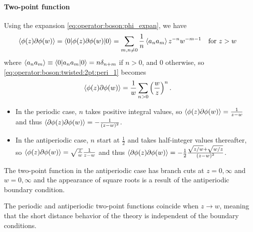 \documentclass[10pt]{article}
\begin{document}
\paragraph{Two-point function}
Using the expansion \cref{eq:operator:boson:phi_expan}, we have 
\begin{align}
    \expval{\phi(z)\partial\phi(w)}=\ev**{\phi(z)\partial\phi(w)}{0}=\sum_{m,n\neq0}\frac{1}{n}\expval{a_n a_m}z^{-n}w^{-m-1}\quad\text{for}\ z>w\label{eq:operator:boson:twisted:2pt:peri_1}
\end{align}
where $\expval{a_n a_m}\equiv\ev**{a_n a_m}{0}=n\delta_{n+m}$ if $n>0$, and 0 otherwise, so \cref{eq:operator:boson:twisted:2pt:peri_1} becomes 
\begin{align}
    \expval{\phi(z)\partial\phi(w)}=\frac{1}{w}\sum_{n>0}\left(\frac{w}{z}\right)^n.
\end{align}
\begin{itemize}
    \item In the periodic case, $n$ takes positive integral values, so $\expval{\phi(z)\partial\phi(w)}=\frac{1}{z-w}$ and thus $\expval{\partial\phi(z)\partial\phi(w)}=-\frac{1}{(z-w)^2}$.
    \item In the antiperiodic case, $n$ start at $\frac{1}{2}$ and takes half-integer values thereafter, so $\expval{\phi(z)\partial\phi(w)}=\sqrt{\frac{z}{w}}\frac{1}{z-w}$ and thus $\expval{\partial\phi(z)\partial\phi(w)}=-\frac{1}{2}\frac{\sqrt{z/w}+\sqrt{w/z}}{(z-w)^2}$.
\end{itemize}
\begin{remark}
    The two-point function in the antiperiodic case has branch cuts at $z=0,\infty$ and $w=0,\infty$ and the appearance of square roots is a result of the antiperiodic boundary condition.
    
    The periodic and antiperiodic two-point functions coincide when $z\to w$, meaning that the short distance behavior of the theory is independent of the boundary conditions.
\end{remark}
\end{document}
